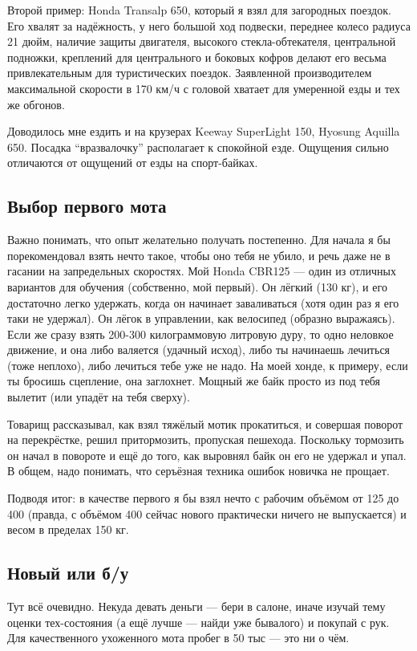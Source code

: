 \documentclass[12pt,a4paper]{article}
\begin{document}
Второй пример: Honda Transalp 650, который я взял для загородных поездок.
Его хвалят за надёжность, у него большой ход подвески, переднее колесо
радиуса 21 дюйм, наличие защиты двигателя, высокого стекла-обтекателя,
центральной подножки, креплений для центрального и боковых кофров делают
его весьма привлекательным для туристических поездок. Заявленной
производителем максимальной скорости в 170 км/ч с головой хватает для
умеренной езды и тех же обгонов.

Доводилось мне ездить и на крузерах Keeway SuperLight 150,
Hyosung Aquilla 650. Посадка ``вразвалочку'' располагает к спокойной езде.
Ощущения сильно отличаются от ощущений от езды на спорт-байках.

\subsection{Выбор первого мота}

Важно понимать, что опыт желательно получать постепенно. Для начала я
бы порекомендовал взять нечто такое, чтобы оно тебя не убило, и речь
даже не в гасании на запредельных скоростях. Мой Honda CBR125 --- один из
отличных вариантов для обучения (собственно, мой первый). Он лёгкий
(130 кг), и его достаточно легко удержать, когда он начинает
заваливаться (хотя один раз я его таки не удержал). Он лёгок в
управлении, как велосипед (образно выражаясь). Если же сразу взять
200-300 килограммовую литровую дуру, то одно неловкое движение, и она
либо валяется (удачный исход), либо ты начинаешь лечиться (тоже
неплохо), либо лечиться тебе уже не надо.
На моей хонде, к примеру, если ты бросишь сцепление, она заглохнет.
Мощный же байк просто из под тебя вылетит (или упадёт на тебя сверху).

Товарищ рассказывал, как взял тяжёлый мотик прокатиться, и совершая
поворот на перекрёстке, решил притормозить, пропуская пешехода.
Поскольку тормозить он начал в повороте и ещё до того, как выровнял
байк он его не удержал и упал. В общем, надо понимать, что серъёзная
техника ошибок новичка не прощает.

Подводя итог: в качестве первого я бы взял нечто с рабочим объёмом от
125 до 400 (правда, с объёмом 400 сейчас нового практически ничего не
выпускается) и весом в пределах 150 кг.

\subsection{Новый или б/у}

Тут всё очевидно. Некуда девать деньги --- бери в салоне, иначе изучай
тему оценки тех-состояния (а ещё лучше --- найди уже бывалого) и покупай
с рук. Для качественного ухоженного мота пробег в 50 тыс --- это ни о чём.
\end{document}
